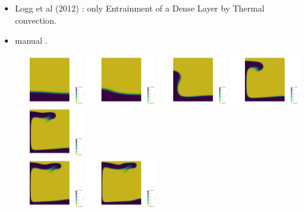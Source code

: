 \begin{itemize}
\item Logg et al (2012) \cite{lomw12}: only Entrainment of a Dense Layer by Thermal convection.

\newpage
\item \aspect{} manual \cite{aspectmanual}.

\begin{center}
\includegraphics[width=3cm]{images/benchmark_vaks97/aspect/lvl7/composition0000}
\includegraphics[width=3cm]{images/benchmark_vaks97/aspect/lvl7/composition0001}
\includegraphics[width=3cm]{images/benchmark_vaks97/aspect/lvl7/composition0002}
\includegraphics[width=3cm]{images/benchmark_vaks97/aspect/lvl7/composition0003}
\includegraphics[width=3cm]{images/benchmark_vaks97/aspect/lvl7/composition0004}\\
\includegraphics[width=3cm]{images/benchmark_vaks97/aspect/lvl7/composition0005}
\includegraphics[width=3cm]{images/benchmark_vaks97/aspect/lvl7/composition0006}

\end{center}
\end{itemize}
